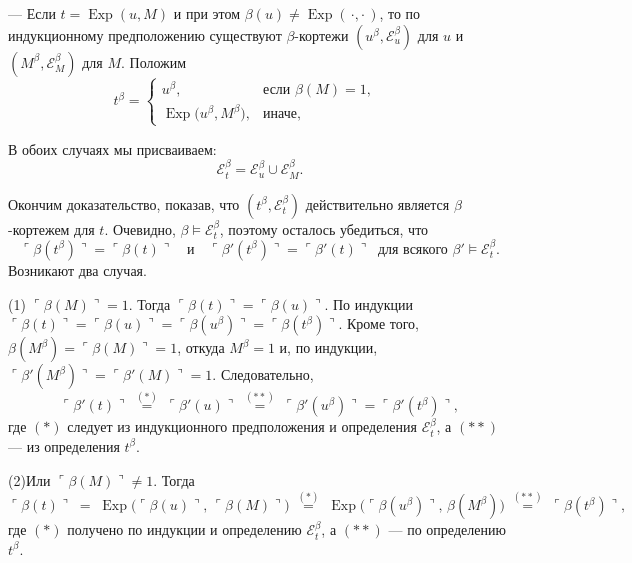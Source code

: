 \medskip\noindent
— Если $t=\operatorname{Exp}(u,M)$ и при этом
$\beta(u)\neq\operatorname{Exp}(\,\cdot,\cdot\,)$,
то по индукционному предположению существуют $\beta$-кортежи
$(u^{\beta},\mathcal E_{u}^{\beta})$ для $u$
и $(M^{\beta},\mathcal E_{M}^{\beta})$ для $M$.
Положим
\[
  t^{\beta}=
  \begin{cases}
    u^{\beta}, & \text{если } \beta(M)=1,\\[4pt]
    \operatorname{Exp}\!\bigl(u^{\beta},M^{\beta}\bigr), & \text{иначе},
  \end{cases}
  \qquad
\]

В обоих случаях мы присваиваем:
\[
\mathcal E_{t}^{\beta}= \mathcal E_{u}^{\beta}\cup\mathcal E_{M}^{\beta}.
\]

Окончим доказательство, показав, что $(t^{\beta},\mathcal E_{t}^{\beta})$
действительно является $\beta$-кортежем для $t$.
Очевидно, $\beta\models\mathcal E_{t}^{\beta}$, поэтому осталось
убедиться, что
\[
  \ulcorner\beta(t^{\beta})\urcorner=\ulcorner\beta(t)\urcorner
  \quad\text{и}\quad
  \ulcorner\beta'(t^{\beta})\urcorner=\ulcorner\beta'(t)\urcorner
  \;\; \text{для всякого } \beta'\models\mathcal E_{t}^{\beta}.
\]
Возникают два случая.

\medskip
(1) $\ulcorner\beta(M)\urcorner=1$.
Тогда $\ulcorner\beta(t)\urcorner=\ulcorner\beta(u)\urcorner$.
По индукции
\(
  \ulcorner\beta(t)\urcorner
  =\ulcorner\beta(u)\urcorner
  =\ulcorner\beta(u^{\beta})\urcorner
  =\ulcorner\beta(t^{\beta})\urcorner.
\)
Кроме того,
$\beta(M^{\beta})=\ulcorner\beta(M)\urcorner=1$, откуда $M^{\beta}=1$
и, по индукции,
$\ulcorner\beta'(M^{\beta})\urcorner=\ulcorner\beta'(M)\urcorner=1$.
Следовательно,
\[
  \ulcorner\beta'(t)\urcorner
  \;\overset{(*)}{=}\;
  \ulcorner\beta'(u)\urcorner
  \;\overset{(**)}{=}\;
  \ulcorner\beta'(u^{\beta})\urcorner
  =\ulcorner\beta'(t^{\beta})\urcorner,
\]
где $(*)$ следует из индукционного предположения и определения
$\mathcal E_{t}^{\beta}$, а $(**)$ — из определения $t^{\beta}$.

\medskip
(2)\;Или $\ulcorner\beta(M)\urcorner\neq1$. Тогда
\[
  \ulcorner\beta(t)\urcorner
    \;=\;
  \operatorname{Exp}\!\bigl(
      \ulcorner\beta(u)\urcorner,\,
      \ulcorner\beta(M)\urcorner
    \bigr)
  \;\overset{(*)}{=}\;
  \operatorname{Exp}\!\bigl(
      \ulcorner\beta(u^{\beta})\urcorner,\,
      \beta(M^{\beta})
    \bigr)
  \;\overset{(**)}{=}\;
  \ulcorner\beta(t^{\beta})\urcorner,
\]
где $(*)$ получено по индукции и определению $\mathcal E_{t}^{\beta}$,
а $(**)$ — по определению $t^{\beta}$.

